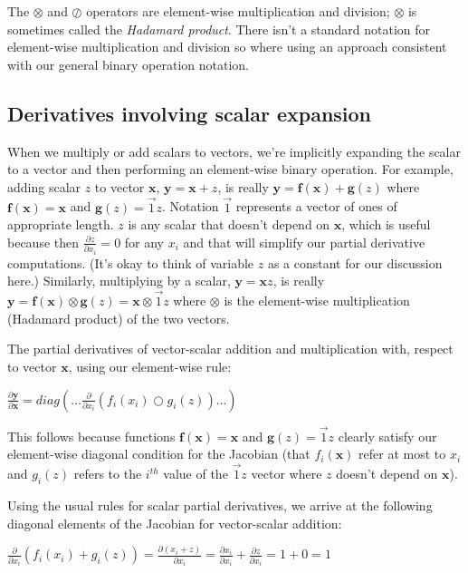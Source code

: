 \documentclass[11pt]{article}
\begin{document}
The $\otimes$ and $\oslash$ operators are element-wise multiplication and division; $\otimes$ is sometimes called the {\em Hadamard product}. There isn't a standard notation for element-wise multiplication and division so where using an approach consistent with our general binary operation notation.

\subsection{Derivatives involving scalar expansion}

When we multiply or add scalars to vectors, we're implicitly expanding the scalar to a vector and then performing an element-wise binary operation. For example, adding scalar $z$  to vector $\mathbf{x}$, $\mathbf{y} = \mathbf{x} + z$,
is really
$\mathbf{y} = \mathbf{f(x)} + \mathbf{g}(z)$ where $\mathbf{f(x)} = \mathbf{x}$ and $\mathbf{g}(z) = \vec{1} z$. Notation $\vec{1}$ represents a vector of ones of appropriate length.  $z$ is any scalar that doesn't depend on $\mathbf{x}$, which is useful because then $\frac{\partial z}{\partial x_i} = 0$ for any $x_i$ and that will simplify our partial derivative computations. (It's okay to think of variable $z$ as a constant for our discussion here.)  Similarly, multiplying by a scalar, $\mathbf{y} = \mathbf{x} z$, is really $\mathbf{y} = \mathbf{f(x)} \otimes \mathbf{g}(z) = \mathbf{x} \otimes \vec{1}z$ where $\otimes$ is the element-wise  multiplication (Hadamard product) of the two vectors.

The partial derivatives of vector-scalar addition and multiplication with, respect to vector $\mathbf{x}$, using our element-wise rule:

$\frac{\partial \mathbf{y}}{\partial \mathbf{x}} = diag \left( \ldots \frac{\partial}{\partial x_i} ( f_i(x_i) \bigcirc g_i(z) ) \ldots \right)$

This follows because functions $\mathbf{f(x)} = \mathbf{x}$ and $\mathbf{g}(z) = \vec{1} z$ clearly satisfy our element-wise diagonal condition for the Jacobian (that $f_i(\mathbf{x})$ refer at most to $x_i$ and $g_i(z)$ refers to the $i^{th}$ value of the $\vec{1}z$ vector where $z$ doesn't depend on $\mathbf{x}$). 

Using the usual rules for scalar partial derivatives, we arrive at the following diagonal elements of the Jacobian for vector-scalar addition:
 
$\frac{\partial}{\partial x_i} ( f_i(x_i) + g_i(z) ) = \frac{\partial (x_i + z)}{\partial x_i} = \frac{\partial x_i}{\partial x_i} + \frac{\partial z}{\partial x_i} = 1 + 0 = 1$
\end{document}

